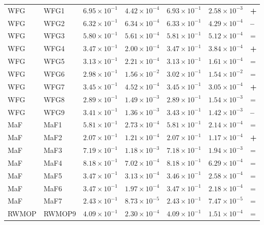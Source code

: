 \begin{table}[t]
\begin{tabular}{llrrrrl}
\addlinespace
WFG & WFG1 & $6.95\!\times\!10^{-1}$ & $4.42\!\times\!10^{-4}$ & $6.93\!\times\!10^{-1}$ & $2.58\!\times\!10^{-3}$ & \textbf{+} \\
WFG & WFG2 & $6.32\!\times\!10^{-1}$ & $6.34\!\times\!10^{-4}$ & $6.33\!\times\!10^{-1}$ & $4.29\!\times\!10^{-4}$ & \textbf{--} \\
WFG & WFG3 & $5.80\!\times\!10^{-1}$ & $5.61\!\times\!10^{-4}$ & $5.81\!\times\!10^{-1}$ & $5.12\!\times\!10^{-4}$ & = \\
WFG & WFG4 & $3.47\!\times\!10^{-1}$ & $2.00\!\times\!10^{-4}$ & $3.47\!\times\!10^{-1}$ & $3.84\!\times\!10^{-4}$ & \textbf{+} \\
WFG & WFG5 & $3.13\!\times\!10^{-1}$ & $2.21\!\times\!10^{-4}$ & $3.13\!\times\!10^{-1}$ & $1.61\!\times\!10^{-4}$ & = \\
WFG & WFG6 & $2.98\!\times\!10^{-1}$ & $1.56\!\times\!10^{-2}$ & $3.02\!\times\!10^{-1}$ & $1.54\!\times\!10^{-2}$ & = \\
WFG & WFG7 & $3.45\!\times\!10^{-1}$ & $4.52\!\times\!10^{-4}$ & $3.45\!\times\!10^{-1}$ & $3.05\!\times\!10^{-4}$ & \textbf{+} \\
WFG & WFG8 & $2.89\!\times\!10^{-1}$ & $1.49\!\times\!10^{-3}$ & $2.89\!\times\!10^{-1}$ & $1.54\!\times\!10^{-3}$ & = \\
WFG & WFG9 & $3.41\!\times\!10^{-1}$ & $1.36\!\times\!10^{-3}$ & $3.43\!\times\!10^{-1}$ & $1.42\!\times\!10^{-3}$ & \textbf{--} \\
\addlinespace
MaF & MaF1 & $5.81\!\times\!10^{-1}$ & $2.73\!\times\!10^{-4}$ & $5.81\!\times\!10^{-1}$ & $2.14\!\times\!10^{-4}$ & = \\
MaF & MaF2 & $2.07\!\times\!10^{-1}$ & $1.21\!\times\!10^{-4}$ & $2.07\!\times\!10^{-1}$ & $1.17\!\times\!10^{-4}$ & \textbf{+} \\
MaF & MaF3 & $7.19\!\times\!10^{-1}$ & $1.18\!\times\!10^{-3}$ & $7.18\!\times\!10^{-1}$ & $1.94\!\times\!10^{-3}$ & = \\
MaF & MaF4 & $8.18\!\times\!10^{-1}$ & $7.02\!\times\!10^{-4}$ & $8.18\!\times\!10^{-1}$ & $6.29\!\times\!10^{-4}$ & = \\
MaF & MaF5 & $3.47\!\times\!10^{-1}$ & $3.13\!\times\!10^{-4}$ & $3.46\!\times\!10^{-1}$ & $2.58\!\times\!10^{-4}$ & = \\
MaF & MaF6 & $3.47\!\times\!10^{-1}$ & $1.97\!\times\!10^{-4}$ & $3.47\!\times\!10^{-1}$ & $2.18\!\times\!10^{-4}$ & = \\
MaF & MaF7 & $2.43\!\times\!10^{-1}$ & $8.73\!\times\!10^{-5}$ & $2.43\!\times\!10^{-1}$ & $7.47\!\times\!10^{-5}$ & = \\
\addlinespace
RWMOP & RWMOP9 & $4.09\!\times\!10^{-1}$ & $2.30\!\times\!10^{-4}$ & $4.09\!\times\!10^{-1}$ & $1.51\!\times\!10^{-4}$ & = \\
\bottomrule
\end{tabular}
\end{table}
